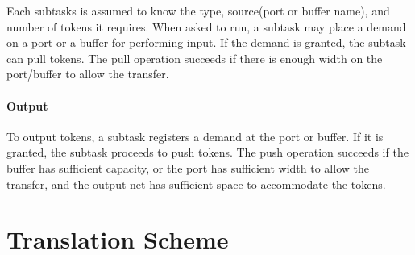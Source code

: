 \documentclass[12pt,a4paper]{report}
\begin{document}
	Each subtasks is assumed to know the type, source(port or buffer name),
	and number of tokens it requires. When asked to run, a subtask may 
	place a demand on a port or a buffer for performing input. 
	If the demand is granted, the subtask can pull tokens. The pull operation
	succeeds if there is enough width on the port/buffer to allow the transfer.

	\subsubsection{Output}
	To output tokens, a subtask registers a demand at
	the port or buffer. If it is granted, the subtask proceeds to 
	push tokens. The push operation succeeds if
	the buffer has sufficient capacity, or the port has sufficient width to allow the transfer, 
	and the output net has	sufficient space to accommodate the tokens.







\chapter{Translation Scheme} \label{chap:translation_scheme}

\cleardoublepage
{}
{}


\end{document}
